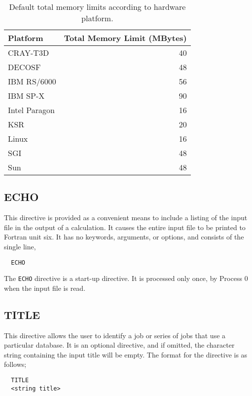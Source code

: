 \begin{table}
\caption{Default total memory limits according to hardware platform.}
\label{tbl:default-memory-limits}
\begin{tabular}{lr}
\hline\hline
Platform        & Total Memory Limit (MBytes) \\
\hline
CRAY-T3D        & 40 \\
DECOSF          & 48 \\
IBM RS/6000     & 56 \\
IBM SP-X        & 90 \\
Intel Paragon   & 16 \\
KSR             & 20 \\
Linux           & 16 \\
SGI             & 48 \\
Sun             & 48 \\
\hline\hline
\end{tabular}
\end{table}

\subsection{ECHO}
\label{sec:echo}

This directive is provided as a convenient means to include a listing of
the input file in the output of a calculation.  It causes the entire input 
file to be printed to Fortran unit six.  It has no keywords, arguments, or
options, and consists of the single line,

\begin{verbatim}
  ECHO
\end{verbatim}

The \verb+ECHO+ directive is a start-up directive.  It is processed only
once, by Process 0 when the input file is read.

\subsection{TITLE}

This directive allows the user to identify a job or series of jobs that use a
particular database.  It is an optional directive, and if omitted, the 
character string containing the input title will be empty.  The format for 
the directive is as follows;

\begin{verbatim}
  TITLE 
  <string title>
\end{verbatim}

